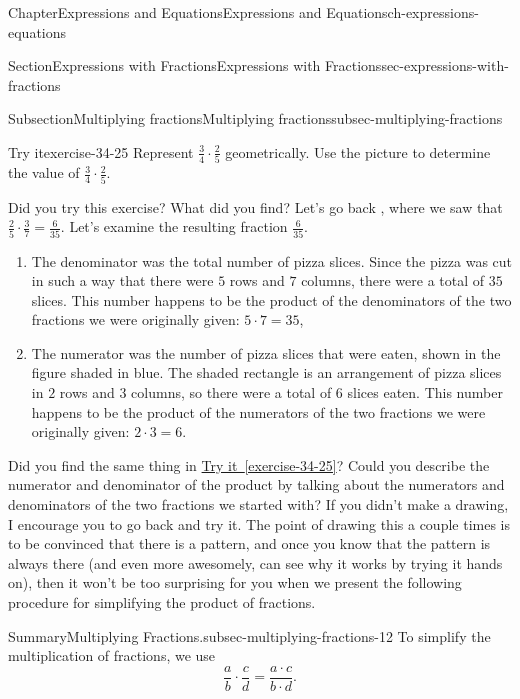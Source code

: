 \documentclass[twoside,11pt,]{book}
\newcommand{\xreffont}{\relax}
\numberwithin{equation}{chapter}
\begin{document}
\begin{chapterptx}{Chapter}{Expressions and Equations}{}{Expressions and Equations}{}{}{ch-expressions-equations}
\begin{sectionptx}{Section}{Expressions with Fractions}{}{Expressions with Fractions}{}{}{sec-expressions-with-fractions}
\begin{subsectionptx}{Subsection}{Multiplying fractions}{}{Multiplying fractions}{}{}{subsec-multiplying-fractions}
\begin{inlineexercise}{Try it}{}{exercise-34-25}%
Represent \(\frac34 \cdot \frac25\) geometrically. Use the picture to determine the value of \(\frac34 \cdot \frac25\).%
\end{inlineexercise}%
Did you try this exercise? What did you find? Let's go back , where we saw that \(\frac25 \cdot \frac37 = \frac{6}{35}\). Let's examine the resulting fraction \(\frac{6}{35}\).%
\begin{enumerate}
\item{}The denominator was the total number of pizza slices. Since the pizza was cut in such a way that there were \(5\) rows and \(7\) columns, there were a total of \(35\) slices. This number happens to be the product of the denominators of the two fractions we were originally given: \(5 \cdot 7 = 35\),%
\item{}The numerator was the number of pizza slices that were eaten, shown in the figure shaded in blue. The shaded rectangle is an arrangement of pizza slices in \(2\) rows and \(3\) columns, so there were a total of \(6\) slices eaten. This number happens to be the product of the numerators of the two fractions we were originally given: \(2 \cdot 3 = 6\).%
\end{enumerate}
Did you find the same thing in \hyperref[exercise-34-25]{Try it~{\xreffont\ref{exercise-34-25}}}? Could you describe the numerator and denominator of the product by talking about the numerators and denominators of the two fractions we started with? If you didn't make a drawing, I encourage you to go back and try it. The point of drawing this a couple times is to be convinced that there is a pattern, and once you know that the pattern is always there (and even more awesomely, can see why it works by trying it hands on), then it won't be too surprising for you when we present the following procedure for simplifying the product of fractions.%
\begin{assemblage}{Summary}{Multiplying Fractions.}{subsec-multiplying-fractions-12}%
To simplify the multiplication of fractions, we use%
\begin{equation*}
\frac{a}{b} \cdot \frac{c}{d} = \frac{a \cdot c}{b \cdot d}.
\end{equation*}
%
\end{assemblage}

\end{subsectionptx}
\end{sectionptx}
\end{chapterptx}
\end{document}
